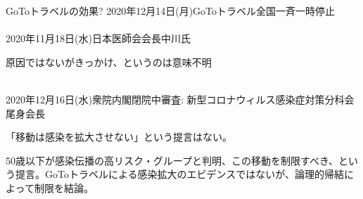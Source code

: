 \begin{frame}[t]{GoToトラベルの効果?}
2020年12月14日(月)GoToトラベル全国一斉一時停止\\~\\
\pause
2020年11月18日(水)日本医師会会長中川氏\\
\begin{dinglist}{43}
\vspace{1.0ex}\setlength{\itemsep}{1.0ex}\setlength{\baselineskip}{12pt}
\pause
\item	原因ではないがきっかけ、というのは意味不明\\~\\
\end{dinglist}

\pause
2020年12月16日(水)衆院内閣閉院中審査: {\scriptsize 新型コロナウィルス感染症対策分科会}尾身会長\\
\begin{dinglist}{43}
\vspace{1.0ex}\setlength{\itemsep}{1.0ex}\setlength{\baselineskip}{12pt}
\item	「移動は感染を拡大させない」という提言はない。
\item	50歳以下が感染伝播の高リスク・グループと判明、この移動を制限すべき、という提言。GoToトラベルによる感染拡大のエビデンスではないが、論理的帰結によって制限を結論。
\end{dinglist}
\end{frame}

